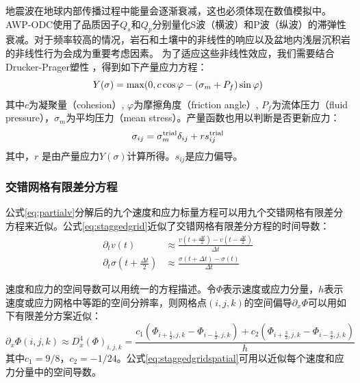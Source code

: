 \documentclass[degree=doctor]{thuthesis}
\begin{document}
地震波在地球内部传播过程中能量会逐渐衰减，这也必须体现在数值模拟中。AWP-ODC使用了品质因子$Q_s$和$Q_p$分别量化S波（横波）和P波（纵波）的滞弹性衰减。对于频率较高的情况，岩石和土壤中的非线性的响应以及盆地内浅层沉积岩的非线性行为会成为重要考虑因素。 为了适应这些非线性效应，我们需要结合Drucker-Prager塑性 \citep {roten2016high}，得到如下产量应力方程：
\begin{equation}
Y(\sigma)={\rm max}(0, c \cos \varphi - ( \sigma_{m} + P_{f} ) \sin\varphi)
\end{equation}
其中$c$为凝聚量（cohesion）, $\varphi$为摩擦角度（friction angle）, $P_{f}$为流体压力（fluid
pressure），$\sigma_{m}$为平均压力（mean stress）。产量函数也用以判断是否更新应力：
\begin{equation}
\sigma_{ij} = \sigma_{m}^{\rm trial} \delta_{ij} + r s_{ij}^{\rm{trial}}
\end{equation}
其中，$r$ 是由产量应力$Y(\sigma)$计算所得。$s_{ij}$是应力偏导。

\subsubsection{交错网格有限差分方程}

公式\ref{eq:partialv}分解后的九个速度和应力标量方程可以用九个交错网格有限差分方程来近似。公式\ref{eq:staggedgrid}近似了交错网格有限差分方程的时间导数：
\begin{equation}
\begin{aligned}
  \partial_tv(t) &\approx \frac{v(t+\frac{\Delta t}{2})- v(t-\frac{\Delta t}{2})}{\Delta t} \\
\partial_{t} \sigma(t+\frac{\Delta t}{2}) &\approx \frac{\sigma(t+\Delta t) - \sigma(t)}{\Delta t}
\end{aligned}
  \label{eq:staggedgrid}
\end{equation}

速度和应力的空间导数可以用统一的方程描述。令$\Phi$表示速度或应力分量，$h$表示速度或应力网格中等距的空间分辨率，则网格点$(i,j,k)$的空间偏导$\partial_x \Phi$可以用如下有限差分方案近似：
\begin{equation}
  \partial_x \Phi(i,j,k) \approx D_x^4(\Phi)_{i,j,k} = \frac{c_1\left(\Phi_{i+\frac{1}{2},j,k} - \Phi_{i-\frac{1}{2},j,k}\right)+ c_2\left(\Phi_{i+\frac{3}{2},j,k} - \Phi_{i-\frac{3}{2},j,k}\right)}{h}
  \label{eq:staggedgridspatial}
\end{equation}
其中$c_1=9/8$，$c_2=-1/24$。公式\ref{eq:staggedgridspatial}可用以近似每个速度和应力分量中的空间导数。
\end{document}
